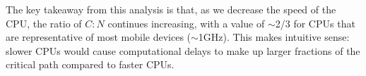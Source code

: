 The key takeaway from this analysis is that, as we decrease the speed of the
CPU, the ratio of $C:N$ continues increasing, with a value of
{\footnotesize$\sim$}2/3 for CPUs that are representative of most mobile
devices ({\footnotesize$\sim$}1GHz). This makes intuitive sense:
slower CPUs would cause computational delays to make up larger fractions of
the critical path compared to faster CPUs.

%
%
%
%
%
%
%
%
